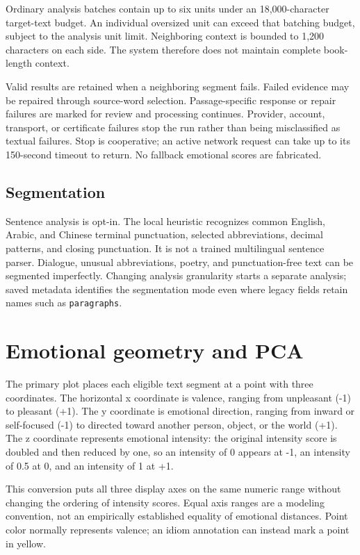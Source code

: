 \documentclass[manuscript,screen,nonacm]{acmart}
\begin{document}
Ordinary analysis batches contain up to six units under an
18,000-character target-text budget. An individual oversized unit can
exceed that batching budget, subject to the analysis unit limit.
Neighboring context is bounded to 1,200 characters on each side. The
system therefore does not maintain complete book-length context.

Valid results are retained when a neighboring segment fails. Failed
evidence may be repaired through source-word selection. Passage-specific
response or repair failures are marked for review and processing
continues. Provider, account, transport, or certificate failures stop
the run rather than being misclassified as textual failures. Stop is
cooperative; an active network request can take up to its 150-second
timeout to return. No fallback emotional scores are fabricated.

\subsection{Segmentation}\label{segmentation}

Sentence analysis is opt-in. The local heuristic recognizes common
English, Arabic, and Chinese terminal punctuation, selected
abbreviations, decimal patterns, and closing punctuation. It is not a
trained multilingual sentence parser. Dialogue, unusual abbreviations,
poetry, and punctuation-free text can be segmented imperfectly. Changing
analysis granularity starts a separate analysis; saved metadata
identifies the segmentation mode even where legacy fields retain names
such as \nolinkurl{paragraphs}.


\section{Emotional geometry and PCA}\label{emotional-geometry-and-pca}



The primary plot places each eligible text segment at a point with three coordinates. The horizontal x coordinate is valence, ranging from unpleasant (-1) to pleasant (+1). The y coordinate is emotional direction, ranging from inward or self-focused (-1) to directed toward another person, object, or the world (+1). The z coordinate represents emotional intensity: the original intensity score is doubled and then reduced by one, so an intensity of 0 appears at -1, an intensity of 0.5 at 0, and an intensity of 1 at +1.

This conversion puts all three display axes on the same numeric range without changing the ordering of intensity scores. Equal axis ranges are a modeling convention, not an empirically established equality of emotional distances. Point color normally represents valence; an idiom annotation can instead mark a point in yellow.
\end{document}
